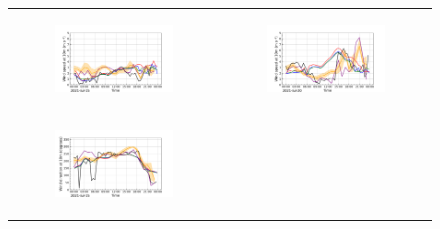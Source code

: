 \begin{figure}[hbtp]
\begin{tabular}{cc}
        \begin{subfigure}[t]{0.5\textwidth}
            \caption{}
            \includegraphics[width=\textwidth]{images/chap5/IOP_TS/TS_2021-07-15_cendrosa_wind_speed_10m.png}
        \end{subfigure} &
        \begin{subfigure}[t]{0.5\textwidth}
            \caption{}
            \includegraphics[width=\textwidth]{images/chap5/IOP_TS/TS_2021-07-20_cendrosa_wind_speed_10m.png}
        \end{subfigure} \\
        \begin{subfigure}[t]{0.5\textwidth}
            \caption{}
            \includegraphics[width=\textwidth]{images/chap5/IOP_TS/TS_2021-07-15_cendrosa_wind_direction_10m.png}

\end{subfigure}
\end{tabular}
\end{figure}
